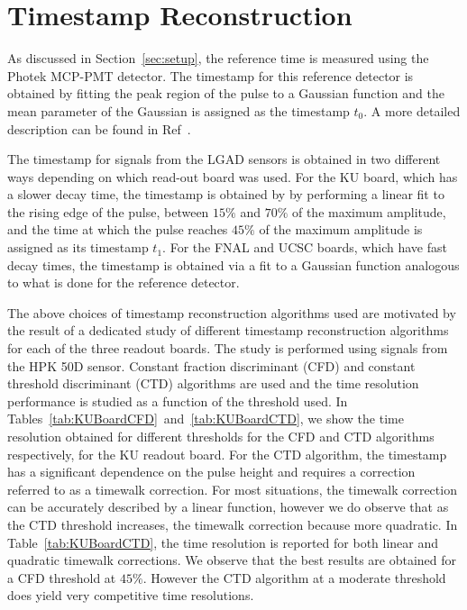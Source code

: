 \documentclass[preprint,1p]{elsarticle}
\begin{document}

\section{Timestamp Reconstruction}
\label{sec:timestampReco}

As discussed in Section~\ref{sec:setup}, the reference time
is measured using the Photek MCP-PMT detector. The timestamp
for this reference detector is obtained by fitting the 
peak region of the pulse to a Gaussian function and the
mean parameter of the Gaussian is assigned as the timestamp $t_0$. 
A more detailed description can be found in Ref~\cite{Anderson:2015gha}.

The timestamp for signals from the LGAD sensors is obtained in two different ways depending on
which read-out board was used. For the KU board, which has a slower decay time,
the timestamp is obtained by by performing a linear fit to the
rising edge of the pulse, between $15\%$ and $70\%$ of the maximum amplitude, 
and the time at which the pulse reaches $45\%$ of the
maximum amplitude is assigned as its timestamp $t_1$. For the FNAL and UCSC boards,
which have fast decay times, the timestamp is obtained via a fit to a 
Gaussian function analogous to what is done for the reference detector.

The above choices of timestamp reconstruction algorithms used
are motivated by the result of a dedicated study of different
timestamp reconstruction algorithms for each of the three readout boards.
The study is performed using signals from the HPK 50D sensor. 
Constant fraction discriminant (CFD) and constant threshold discriminant (CTD)
algorithms are used and the time resolution performance is studied as a function
of the threshold used. In Tables~\ref{tab:KUBoardCFD}~and~\ref{tab:KUBoardCTD}, 
we show the time resolution obtained
for different thresholds for the CFD and CTD algorithms respectively, for the KU
readout board. For the CTD algorithm, the timestamp has a significant dependence
on the pulse height and requires a correction referred to as a timewalk correction. 
For most situations, the timewalk correction can be accurately described by a linear
function, however we do observe that as the CTD threshold increases, the timewalk
correction because more quadratic. In Table~\ref{tab:KUBoardCTD}, the time resolution 
is reported for both linear and quadratic timewalk corrections.
We observe that the best results are obtained for a CFD threshold
at $45\%$. However the CTD algorithm at a moderate threshold does yield very competitive
time resolutions. 
\end{document}
